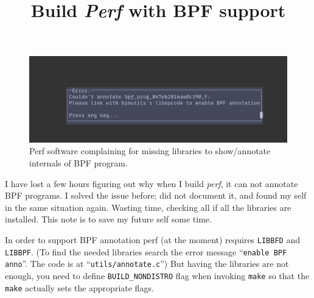 \documentclass{article}
\title{Build \textit{Perf} with BPF support}
\begin{document}
\maketitle


\begin{figure}
  \centering
  \includegraphics{perf_bpf_err.png}
  \caption{Perf software complaining for missing libraries to show/annotate internals of BPF program.}
  \label{fig:perf_bpf_err}
\end{figure}

I have lost a few hours figuring out why when I build \textit{perf}, it can not annotate BPF programs.
I solved the issue before; did not document it, and found my self in the same situation again.
Wasting time, checking all if all the libraries are installed.
This note is to save my future self some time.

In order to support BPF annotation perf (at the moment) requires \texttt{LIBBFD} and \texttt{LIBBPF}.
(To find the needed libraries search the error message ``\texttt{enable BPF anno}''. The code is at ``\texttt{utils/annotate.c}'')
But having the libraries are not enough, you need to define \texttt{BUILD_NONDISTRO} flag when invoking \texttt{make} so that the \texttt{make} actually sets the appropriate flags.
\end{document}
